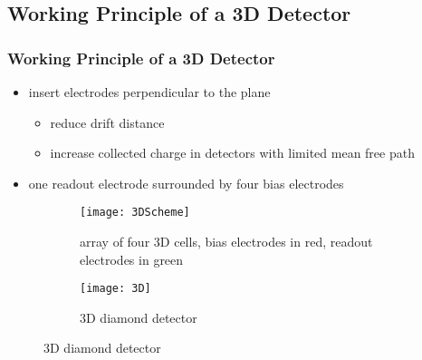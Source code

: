 \subsection{Working Principle of a 3D Detector}
\begin{frame}
	\frametitle{Working Principle of a 3D Detector}
	\begin{itemize}
		\setlength{\itemsep}{\fill}
		\item insert electrodes perpendicular to the plane
		\begin{itemize}
			\item reduce drift distance
			\item increase collected charge in detectors with limited mean free path %
		\end{itemize}
		\item one readout electrode surrounded by four bias electrodes
		
	\end{itemize}
	\begin{figure}
	  \centering
	  \begin{subfigure}[t]{0.45\textwidth}
		\centering
		\texttt{[image: 3DScheme]}
		\caption{array of four 3D cells, bias electrodes in red, readout electrodes in green}
	  \end{subfigure}
	  \begin{subfigure}[t]{0.45\textwidth}
		\centering
		\texttt{[image: 3D]}
		\caption{3D diamond detector}
	  \end{subfigure}
	\end{figure}
\end{frame}

